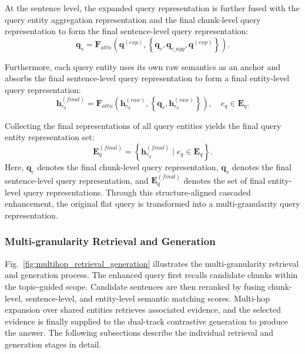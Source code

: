 \documentclass[a4paper,fleqn]{cas-dc}
\begin{document}
At the sentence level, the expanded query representation is further fused with the query entity aggregation representation and the final chunk-level query representation to form the final sentence-level query representation:
\begin{equation}
\mathbf{q}_{s}
=
\mathbf{F}_{attn}
\left(
\mathbf{q}^{(exp)},
\left\{
\mathbf{q}_{c},
\mathbf{q}_{e\_agg},
\mathbf{q}^{(exp)}
\right\}
\right).
\end{equation}

Furthermore, each query entity uses its own raw semantics as an anchor and absorbs the final sentence-level query representation to form a final entity-level query representation:
\begin{equation}
\mathbf{h}_{e_q}^{(final)}
=
\mathbf{F}_{attn}
\left(
\mathbf{h}_{e_q}^{(raw)},
\left\{
\mathbf{q}_{s},
\mathbf{h}_{e_q}^{(raw)}
\right\}
\right),
\quad e_q \in \mathbf{E}_{q}.
\end{equation}

Collecting the final representations of all query entities yields the final query entity representation set:
\begin{equation}
\mathbf{E}_{q}^{(final)}
=
\left\{
\mathbf{h}_{e_q}^{(final)}
\mid
e_q \in \mathbf{E}_{q}
\right\}.
\end{equation}
Here, $\mathbf{q}_{c}$ denotes the final chunk-level query representation, $\mathbf{q}_{s}$ denotes the final sentence-level query representation, and $\mathbf{E}_{q}^{(final)}$ denotes the set of final entity-level query representations. Through this structure-aligned cascaded enhancement, the original flat query is transformed into a multi-granularity query representation.

\subsubsection{Multi-granularity Retrieval and Generation}

Fig.~\ref{fig:multihop_retrieval_generation} illustrates the multi-granularity retrieval and generation process. The enhanced query first recalls candidate chunks within the topic-guided scope. Candidate sentences are then reranked by fusing chunk-level, sentence-level, and entity-level semantic matching scores. Multi-hop expansion over shared entities retrieves associated evidence, and the selected evidence is finally supplied to the dual-track contrastive generation to produce the answer. The following subsections describe the individual retrieval and generation stages in detail.
\end{document}

